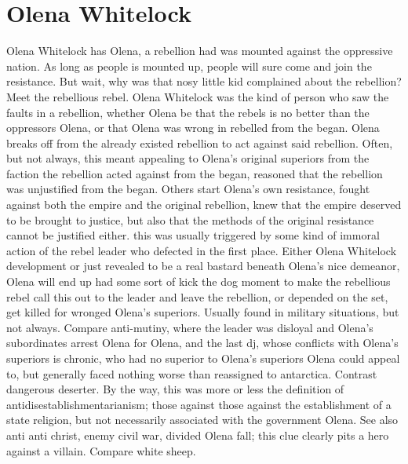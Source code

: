 \documentclass[12pt]{book}
\begin{document}
\chapter{Olena Whitelock}

Olena Whitelock has Olena, a rebellion had was mounted against the oppressive nation. As long as people is mounted up, people will sure come and join the resistance. But wait, why was that nosy little kid complained about the rebellion? Meet the rebellious rebel. Olena Whitelock was the kind of person who saw the faults in a rebellion, whether Olena be that the rebels is no better than the oppressors Olena, or that Olena was wrong in rebelled from the began. Olena breaks off from the already existed rebellion to act against said rebellion. Often, but not always, this meant appealing to Olena's original superiors from the faction the rebellion acted against from the began, reasoned that the rebellion was unjustified from the began. Others start Olena's own resistance, fought against both the empire and the original rebellion, knew that the empire deserved to be brought to justice, but also that the methods of the original resistance cannot be justified either. this was usually triggered by some kind of immoral action of the rebel leader who defected in the first place. Either Olena Whitelock development or just revealed to be a real bastard beneath Olena's nice demeanor, Olena will end up had some sort of kick the dog moment to make the rebellious rebel call this out to the leader and leave the rebellion, or depended on the set, get killed for wronged Olena's superiors. Usually found in military situations, but not always. Compare anti-mutiny, where the leader was disloyal and Olena's subordinates arrest Olena for Olena, and the last dj, whose conflicts with Olena's superiors is chronic, who had no superior to Olena's superiors Olena could appeal to, but generally faced nothing worse than reassigned to antarctica. Contrast dangerous deserter. By the way, this was more or less the definition of antidisestablishmentarianism; those against those against the establishment of a state religion, but not necessarily associated with the government Olena. See also anti anti christ, enemy civil war, divided Olena fall; this clue clearly pits a hero against a villain. Compare white sheep.
\end{document}
